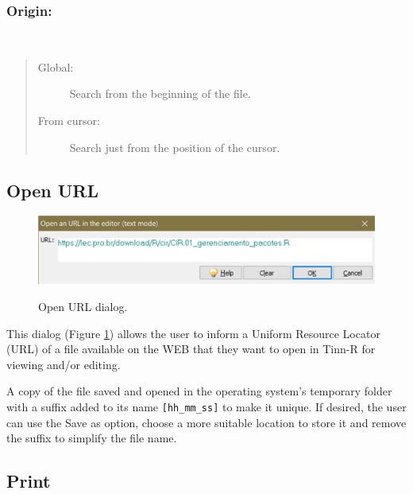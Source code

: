 \subsubsection{Origin:}\\
\begin{quote}
  \begin{footnotesize}
    \begin{description}
      \item[Global:]
        Search from the beginning of the file.
      \item[From cursor:]
        Search just from the position of the cursor.
    \end{description}
  \end{footnotesize}
\end{quote}


\hypertarget{dlg_open_url}{}
\subsection{Open URL}

\begin{figure}[H]
  \includegraphics[scale=0.50]{./res/dlg_open_url.png} \\
  \caption{Open URL dialog.}
  \label{fig:dlg_open_url}
\end{figure}
This dialog
(Figure \ref{fig:dlg_open_url})
allows the user to inform a Uniform Resource Locator (URL) of a file available on the WEB
that they want to open in Tinn-R for viewing and/or editing.

A copy of the file saved and opened in the operating system's temporary folder
with a suffix added to its name \texttt{[hh\_mm\_ss]} to make it unique. If desired,
the user can use the Save as option, choose a more suitable location to
store it and remove the suffix to simplify the file name.


\hypertarget{dlg_print}{}
\subsection{Print}

